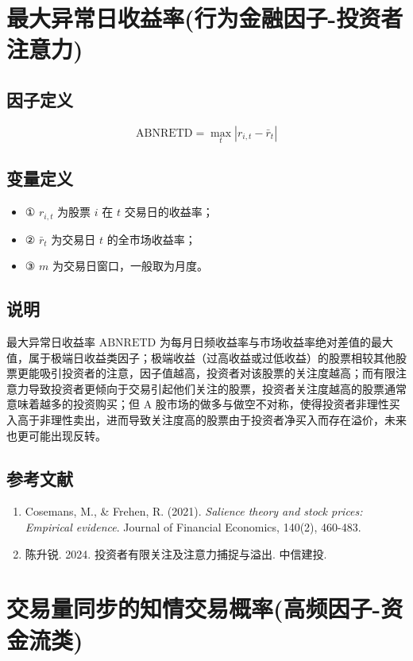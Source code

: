 \documentclass{article}
\begin{document}
\section{最大异常日收益率(行为金融因子-投资者注意力)}

\subsection{因子定义}
\begin{equation}
    \mathrm{ABNRETD} = \max_t |r_{i,t} - \bar{r}_t|
\end{equation}

\subsection{变量定义}
\begin{itemize}
    \item ① \( r_{i,t} \) 为股票 \( i \) 在 \( t \) 交易日的收益率；
    \item ② \( \bar{r}_t \) 为交易日 \( t \) 的全市场收益率；
    \item ③ \( m \) 为交易日窗口，一般取为月度。
\end{itemize}

\subsection{说明}
最大异常日收益率 \( \mathrm{ABNRETD} \) 为每月日频收益率与市场收益率绝对差值的最大值，属于极端日收益类因子；极端收益（过高收益或过低收益）的股票相较其他股票更能吸引投资者的注意，因子值越高，投资者对该股票的关注度越高；而有限注意力导致投资者更倾向于交易引起他们关注的股票，投资者关注度越高的股票通常意味着越多的投资购买；但 A 股市场的做多与做空不对称，使得投资者非理性买入高于非理性卖出，进而导致关注度高的股票由于投资者净买入而存在溢价，未来也更可能出现反转。

\subsection{参考文献}
\begin{enumerate}
    \item Cosemans, M., \& Frehen, R. (2021). \textit{Salience theory and stock prices: Empirical evidence}. Journal of Financial Economics, 140(2), 460-483.
    \item 陈升锐. 2024. 投资者有限关注及注意力捕捉与溢出. 中信建投.
\end{enumerate}

\section{交易量同步的知情交易概率(高频因子-资金流类)}
\end{document}
